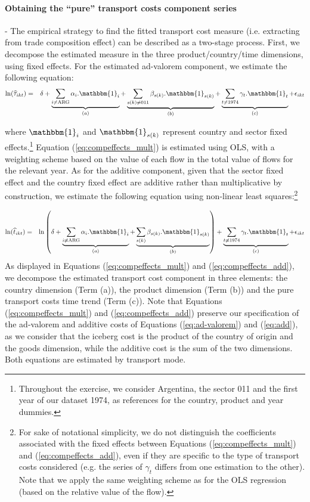 \documentclass[a4paper,11pt]{article}
\begin{document}
\paragraph{Obtaining the ``pure'' transport costs component series} - The empirical strategy to find the fitted transport cost measure (i.e. extracting from trade composition effect) can be described as a two-stage process.
First, we decompose the estimated measure in the three product/country/time dimensions, using fixed effects.
For the estimated ad-valorem component, we estimate the following equation:
\begin{eqnarray}
\ln(\widehat{\tau}_{ikt})&=&\delta +\underbrace{\sum_{i \neq \text{ARG}}\alpha_i.\mathbbm{1}_i}_{(a)} + \underbrace{\sum_{s(k)\neq \text{011}}\beta_{s(k)}.\mathbbm{1}_{s(k)}}_{(b)} + \underbrace{\sum_{t \neq 1974}\gamma_t.\mathbbm{1}_t}_{(c)}+\epsilon_{ikt} \label{eq:compeffects_mult}
\end{eqnarray}

\noindent where $\mathbbm{1}_i$ and $\mathbbm{1}_{s(k)}$ represent country and sector fixed effects.\footnote{Throughout the exercise, we consider Argentina, the sector 011 and the first year of our dataset 1974, as references for the country, product and year dummies.}  Equation (\ref{eq:compeffects_mult}) is estimated using OLS, with a weighting scheme based on the value of each flow in the total value of flows for the relevant year.
As for the additive component, given that the sector fixed effect and the country fixed effect are additive rather than multiplicative by construction, we estimate the following equation using non-linear least squares:\footnote{For sake of notational simplicity, we do not distinguish the coefficients associated with the fixed effects between Equations (\ref{eq:compeffects_mult}) and (\ref{eq:compeffects_add}), even if they are specific to the type of transport costs considered (e.g. the series of $\gamma_t$ differs from one estimation to the other).
Note that we apply the same weighting scheme as for the OLS regression (based on the relative value of the flow).}

\begin{eqnarray}
\ln(\widehat{t}_{ikt})&=&\ln\left( \delta + \underbrace{\sum_{i \neq \text{ARG}}  \alpha_i.\mathbbm{1}_i}_{(a)}+\underbrace{\sum_{s(k)}\beta_{s(k)}.\mathbbm{1}_{s(k)}}_{(b)}\right) + \underbrace{\sum_{t \neq 1974}\gamma_t.\mathbbm{1}_t}_{(c)}+\epsilon_{ikt} \label{eq:compeffects_add}
\end{eqnarray}
As displayed in Equations (\ref{eq:compeffects_mult}) and (\ref{eq:compeffects_add}), we decompose the estimated transport cost component in three elements: the country dimension (Term (a)), the product dimension (Term (b)) and the pure transport costs time trend (Term (c)).
Note that Equations (\ref{eq:compeffects_mult}) and (\ref{eq:compeffects_add}) preserve our specification of the ad-valorem and additive costs of Equations (\ref{eq:ad-valorem}) and (\ref{eq:add}), as we consider that the iceberg cost is the product of the country of origin and the goods dimension, while the additive cost is the sum of the two dimensions.
Both equations are estimated by transport mode.\smallskip
\end{document}

